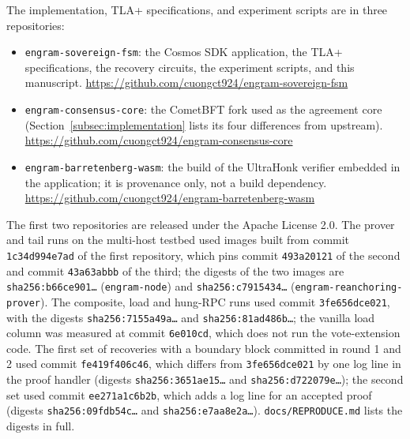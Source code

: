 The implementation, TLA+ specifications, and experiment scripts are in three
repositories:
\begin{itemize}
  \item \texttt{engram-sovereign-fsm}: the Cosmos SDK application, the TLA+
  specifications, the recovery circuits, the experiment scripts, and this
  manuscript. \url{https://github.com/cuongct924/engram-sovereign-fsm}
  \item \texttt{engram-consensus-core}: the CometBFT fork used as the agreement
  core (Section~\ref{subsec:implementation} lists its four differences from
  upstream). \url{https://github.com/cuongct924/engram-consensus-core}
  \item \texttt{engram-barretenberg-wasm}: the build of the UltraHonk verifier
  embedded in the application; it is provenance only, not a build dependency.
  \url{https://github.com/cuongct924/engram-barretenberg-wasm}
\end{itemize}
The first two repositories are released under the Apache License 2.0.
The prover and tail runs on the multi-host testbed used images built from commit \texttt{1c34d994e7ad} of the first repository, which pins commit \texttt{493a20121} of the second and commit \texttt{43a63abbb} of the third; the digests of the two images are \texttt{sha256:b66ce901\dots} (\texttt{engram-node}) and \texttt{sha256:c7915434\dots} (\texttt{engram-reanchoring-prover}). The composite, load and hung-RPC runs used commit \texttt{3fe656dce021}, with the digests \texttt{sha256:7155a49a\dots} and \texttt{sha256:81ad486b\dots}; the vanilla load column was measured at commit \texttt{6e010cd}, which does not run the vote-extension code. The first set of recoveries with a boundary block committed in round 1 and 2 used commit \texttt{fe419f406c46}, which differs from \texttt{3fe656dce021} by one log line in the proof handler (digests \texttt{sha256:3651ae15\dots} and \texttt{sha256:d722079e\dots}); the second set used commit \texttt{ee271a1c6b2b}, which adds a log line for an accepted proof (digests \texttt{sha256:09fdb54c\dots} and \texttt{sha256:e7aa8e2a\dots}). \texttt{docs/REPRODUCE.md} lists the digests in full.
